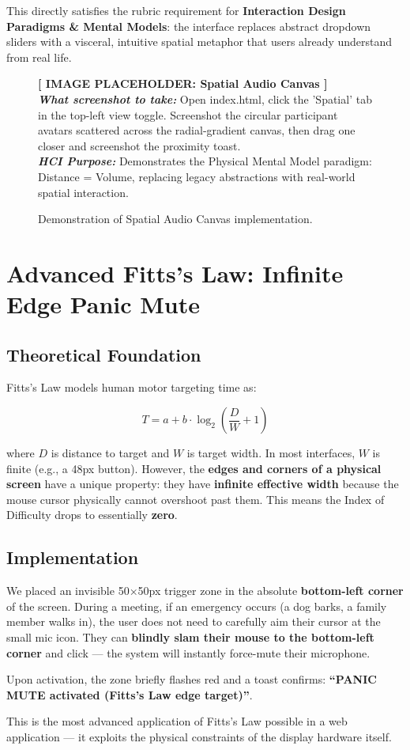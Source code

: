 \documentclass[12pt,a4paper]{article}
\newcommand{\imageplaceholder}[3]{
    \begin{figure}[H]
        \centering
        \begin{tcolorbox}[colback=placeholderbg,colframe=placeholderborder,arc=4mm,height=7.5cm,valign=center,halign=center]
            {\Large\textbf{\textcolor{hciblue}{[ IMAGE PLACEHOLDER: #1 ]}}}\\[0.5cm]
            \textit{\textbf{What screenshot to take:}} #2\\[0.3cm]
            \textit{\textbf{HCI Purpose:}} #3
        \end{tcolorbox}
        \caption{Demonstration of #1 implementation.}
    \end{figure}
}
\begin{document}
This directly satisfies the rubric requirement for \textbf{Interaction Design Paradigms \& Mental Models}: the interface replaces abstract dropdown sliders with a visceral, intuitive spatial metaphor that users already understand from real life.

\imageplaceholder{Spatial Audio Canvas}{Open index.html, click the 'Spatial' tab in the top-left view toggle. Screenshot the circular participant avatars scattered across the radial-gradient canvas, then drag one closer and screenshot the proximity toast.}{Demonstrates the Physical Mental Model paradigm: Distance = Volume, replacing legacy abstractions with real-world spatial interaction.}

\section{Advanced Fitts's Law: Infinite Edge Panic Mute}

\subsection{Theoretical Foundation}
Fitts's Law models human motor targeting time as:

\[
T = a + b \cdot \log_2\left(\frac{D}{W} + 1\right)
\]

where $D$ is distance to target and $W$ is target width. In most interfaces, $W$ is finite (e.g., a 48px button). However, the \textbf{edges and corners of a physical screen} have a unique property: they have \textbf{infinite effective width} because the mouse cursor physically cannot overshoot past them. This means the Index of Difficulty drops to essentially \textbf{zero}.

\subsection{Implementation}
We placed an invisible 50×50px trigger zone in the absolute \textbf{bottom-left corner} of the screen. During a meeting, if an emergency occurs (a dog barks, a family member walks in), the user does not need to carefully aim their cursor at the small mic icon. They can \textbf{blindly slam their mouse to the bottom-left corner} and click — the system will instantly force-mute their microphone.

Upon activation, the zone briefly flashes red and a toast confirms: \textbf{``PANIC MUTE activated (Fitts's Law edge target)''}.

This is the most advanced application of Fitts's Law possible in a web application — it exploits the physical constraints of the display hardware itself.
\end{document}
